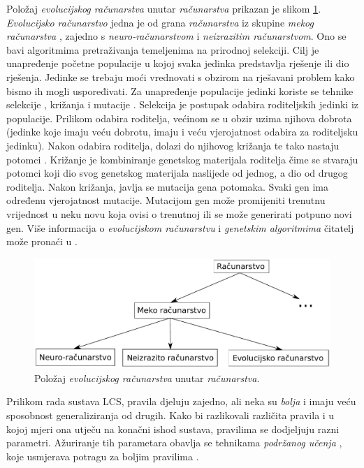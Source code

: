 \documentclass[times, utf8, zavrsni]{fer}
\begin{document}
Položaj \emph{evolucijskog računarstva} unutar \emph{računarstva} prikazan je slikom \ref{img:racpol}.
\emph{Evolucijsko računarstvo} jedna je od grana \emph{računarstva} iz skupine \emph{mekog računarstva} , zajedno s \emph{neuro-računarstvom} i \emph{neizrazitim računarstvom}.
Ono se bavi algoritmima pretraživanja temeljenima na prirodnoj selekciji.
Cilj je unapređenje početne populacije u kojoj svaka jedinka predstavlja rješenje ili dio rješenja.
Jedinke se trebaju moći vrednovati s obzirom na rješavani problem kako bismo ih mogli uspoređivati.
Za unapređenje populacije jedinki koriste se tehnike selekcije , križanja  i mutacije .
Selekcija je postupak odabira roditeljskih jedinki iz populacije.
Prilikom odabira roditelja, većinom se u obzir uzima njihova dobrota (jedinke koje imaju veću dobrotu, imaju i veću vjerojatnost odabira za roditeljsku jedinku).
Nakon odabira roditelja, dolazi do njihovog križanja te tako nastaju potomci .
Križanje je kombiniranje genetskog materijala roditelja čime se stvaraju potomci koji dio svog genetskog materijala naslijede od jednog, a dio od drugog roditelja.
Nakon križanja, javlja se mutacija gena potomaka.
Svaki gen ima određenu vjerojatnost mutacije.
Mutacijom gen može promijeniti trenutnu vrijednost u neku novu koja ovisi o trenutnoj ili se može generirati potpuno novi gen.
Više informacija o \emph{evolucijskom računarstvu} i \emph{genetskim algoritmima} čitatelj može pronaći u \citep{6}.
\begin{figure}[!h]
    \centering
    \includegraphics[width=\textwidth]{img/racpol.pdf}
    \caption{Položaj \emph{evolucijskog računarstva} unutar \emph{računarstva}.}
    \label{img:racpol}
\end{figure}

Prilikom rada sustava LCS, pravila djeluju zajedno, ali neka su \emph{bolja} i imaju veću sposobnost generaliziranja od drugih.
Kako bi razlikovali različita pravila i u kojoj mjeri ona utječu na konačni ishod sustava, pravilima se dodjeljuju razni parametri.
Ažuriranje tih parametara obavlja se tehnikama \emph{podržanog učenja} , koje usmjerava potragu za boljim pravilima \citep{3}.
\end{document}
